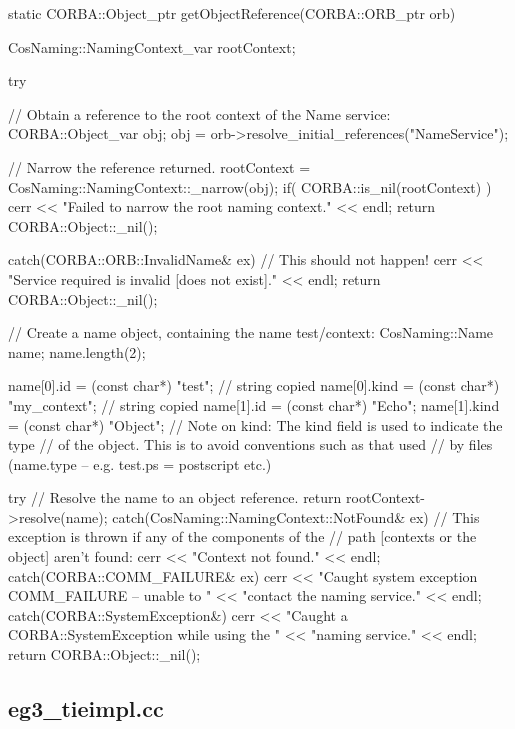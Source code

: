 \documentclass[11pt,twoside,a4paper]{book}
\begin{document}
\begin{cxxlisting}
static CORBA::Object_ptr
getObjectReference(CORBA::ORB_ptr orb)
{
  CosNaming::NamingContext_var rootContext;
  
  try {
    // Obtain a reference to the root context of the Name service:
    CORBA::Object_var obj;
    obj = orb->resolve_initial_references("NameService");

    // Narrow the reference returned.
    rootContext = CosNaming::NamingContext::_narrow(obj);
    if( CORBA::is_nil(rootContext) ) {
      cerr << "Failed to narrow the root naming context." << endl;
      return CORBA::Object::_nil();
    }
  }
  catch(CORBA::ORB::InvalidName& ex) {
    // This should not happen!
    cerr << "Service required is invalid [does not exist]." << endl;
    return CORBA::Object::_nil();
  }

  // Create a name object, containing the name test/context:
  CosNaming::Name name;
  name.length(2);

  name[0].id   = (const char*) "test";       // string copied
  name[0].kind = (const char*) "my_context"; // string copied
  name[1].id   = (const char*) "Echo";
  name[1].kind = (const char*) "Object";
  // Note on kind: The kind field is used to indicate the type
  // of the object. This is to avoid conventions such as that used
  // by files (name.type -- e.g. test.ps = postscript etc.)

  try {
    // Resolve the name to an object reference.
    return rootContext->resolve(name);
  }
  catch(CosNaming::NamingContext::NotFound& ex) {
    // This exception is thrown if any of the components of the
    // path [contexts or the object] aren't found:
    cerr << "Context not found." << endl;
  }
  catch(CORBA::COMM_FAILURE& ex) {
    cerr << "Caught system exception COMM_FAILURE -- unable to "
         << "contact the naming service." << endl;
  }
  catch(CORBA::SystemException&) {
    cerr << "Caught a CORBA::SystemException while using the "
         << "naming service." << endl;
  }
  return CORBA::Object::_nil();
}
\end{cxxlisting}


\clearpage
\subsection{eg3\_tieimpl.cc}
\end{document}
